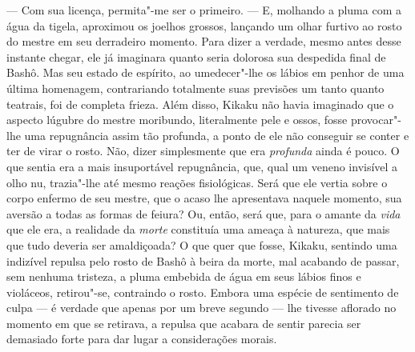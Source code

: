 --- Com sua licença, permita"-me ser o primeiro. --- E, molhando a pluma com
a água da tigela, aproximou os joelhos grossos, lançando um olhar
furtivo ao rosto do mestre em seu derradeiro momento. Para dizer a
verdade, mesmo antes desse instante 
chegar, ele já imaginara quanto seria dolorosa sua despedida final de
Bashô. Mas seu estado de espírito, ao umedecer"-lhe os lábios em penhor
de uma última homenagem, contrariando totalmente suas previsões um
tanto quanto teatrais, foi de completa frieza. Além disso, Kikaku não
havia imaginado que o aspecto lúgubre do mestre moribundo, literalmente
pele e ossos, fosse provocar"-lhe uma repugnância assim tão profunda, a
ponto de ele não conseguir se conter e ter de virar o rosto. Não, dizer
simplesmente que era \textit{profunda} ainda é pouco. O que sentia era a mais
insuportável repugnância, que, qual um veneno invisível a olho nu,
trazia"-lhe até mesmo reações fisiológicas. Será que ele vertia sobre o
corpo enfermo de seu mestre, que o acaso lhe apresentava naquele
momento, sua aversão a todas as formas de feiura? Ou, então, será que,
para o amante da \textit{vida} que ele era, a realidade da \textit{morte} constituía
uma ameaça à natureza, que mais que tudo deveria ser amaldiçoada? O que
quer que fosse, Kikaku, sentindo uma indizível repulsa pelo rosto de
Bashô à beira da morte, mal acabando de passar, sem nenhuma tristeza, a
pluma embebida de água em seus lábios finos e violáceos, retirou"-se,
contraindo o rosto. Embora uma espécie de sentimento de culpa --- é
verdade que apenas por um breve segundo --- lhe tivesse aflorado no
momento em que se retirava, a repulsa que acabara de sentir parecia ser
demasiado forte para dar lugar a considerações morais.

